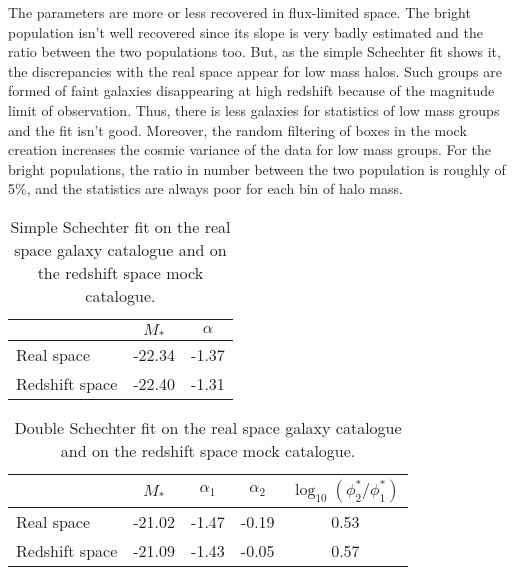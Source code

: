 The parameters are more or less recovered in flux-limited space. The bright
population isn't well recovered since its slope is very badly estimated and
the ratio between the two populations too. But, as the simple Schechter fit
shows it, the discrepancies with the real space appear for low mass halos.
Such groups are formed of faint galaxies disappearing at high redshift
because of the magnitude limit of observation. Thus, there is less galaxies
for statistics of low mass groups and the fit isn't good. Moreover, the
random filtering of boxes in the mock creation increases the cosmic variance
of the data for low mass groups. For the bright populations, the ratio
in number between the two  population is roughly of 5\%, and the statistics
are always poor for each bin of halo mass.
%
\begin{table}
    \centering
    \caption{Simple Schechter fit on the real space galaxy catalogue and on
    the redshift space mock catalogue.}
    \begin{tabular}{lcc}
        \toprule
        & $M_*$ & $\alpha$ \\
        \toprule
        Real space & -22.34 & -1.37 \\
        \midrule
        Redshift space & -22.40 & -1.31 \\
        \bottomrule
    \end{tabular}
\end{table}
%
\begin{table}
    \centering
    \caption{Double Schechter fit on the real space galaxy catalogue and on
    the redshift space mock catalogue.}
    \begin{tabular}{lcccc}
        \toprule
        & $M_*$ & $\alpha_1$ & $\alpha_2$ &
        $\log_{10}\left(\phi_2^*/\phi_1^*\right)$ \\
        \toprule
        Real space & -21.02 & -1.47 & -0.19 & 0.53 \\
        \midrule
        Redshift space & -21.09 & -1.43 & -0.05 & 0.57 \\
        \bottomrule
    \end{tabular}
\end{table}

